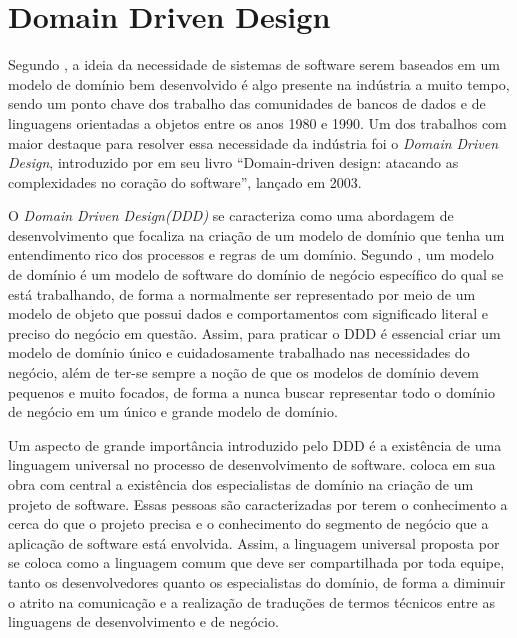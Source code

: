 \documentclass[12pt, %
openright, 
oneside, %
a4paper,    %
brazil]{facom-ufu-abntex2}
\begin{document}
\section{Domain Driven Design}
Segundo , a ideia da necessidade de sistemas de software serem baseados em um modelo de domínio bem desenvolvido é algo presente na indústria a muito tempo, sendo um ponto chave dos trabalho das comunidades de bancos de dados e de linguagens orientadas a objetos entre os anos 1980 e 1990. Um dos trabalhos com maior destaque para resolver essa necessidade da indústria foi o \textit{Domain Driven Design}, introduzido por  em seu livro ``Domain-driven design: atacando as complexidades no coração do software'', lançado em 2003.

O \textit{Domain Driven Design(DDD)} se caracteriza como uma abordagem de desenvolvimento que focaliza na criação de um modelo de domínio que tenha um entendimento rico dos processos e regras de um domínio. Segundo , um modelo de domínio é um modelo de software do domínio de negócio específico do qual se está trabalhando, de forma a normalmente ser representado por meio de um modelo de objeto que possui dados e comportamentos com significado literal e preciso do negócio em questão. Assim, para praticar o DDD é essencial criar um modelo de domínio único e cuidadosamente trabalhado nas necessidades do negócio, além de ter-se sempre a noção de que os modelos de domínio devem pequenos e muito focados, de forma a nunca buscar representar todo o domínio de negócio em um único e grande modelo de domínio.

Um aspecto de grande importância introduzido pelo DDD é a existência de uma linguagem universal no processo de desenvolvimento de software.  coloca em sua obra com central a existência dos especialistas de domínio na criação de um projeto de software. Essas pessoas são caracterizadas por terem o conhecimento a cerca do que o projeto precisa e o conhecimento do segmento de negócio que a aplicação de software está envolvida. Assim, a linguagem universal proposta por  se coloca como a linguagem comum que deve ser compartilhada por toda equipe, tanto os desenvolvedores quanto os especialistas do domínio, de forma a diminuir o atrito na comunicação e a realização de traduções de termos técnicos entre as linguagens de desenvolvimento e de negócio.
\end{document}

